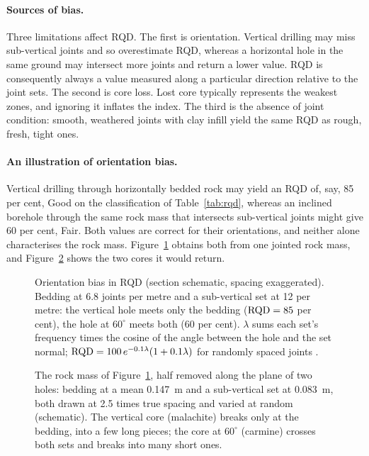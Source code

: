 \paragraph{Sources of bias.}
Three limitations affect RQD. The first is orientation. Vertical
drilling may miss sub-vertical joints and so overestimate RQD, whereas a
horizontal hole in the same ground may intersect more joints and return a
lower value. RQD is consequently always a value
measured along a particular direction relative to the joint sets. The second is core
loss. Lost core typically represents the weakest zones, and ignoring it
inflates the index. The third is the absence of joint condition: smooth,
weathered joints with clay infill yield the same RQD as rough, fresh, tight
ones.

\paragraph{An illustration of orientation bias.}
Vertical drilling through horizontally bedded rock may yield an RQD of, say,
85 per cent, Good on the classification of Table~\ref{tab:rqd}, whereas an
inclined borehole through the same rock mass that intersects sub-vertical
joints might give 60 per cent, Fair. Both values are correct for their
orientations, and neither alone characterises the rock mass.
Figure~\ref{fig:rqd-orientation-bias} obtains both from one jointed rock mass,
and Figure~\ref{fig:r3d-rqd-orientation} shows the two cores it would return.

\begin{figure}[htbp]
\centering
{}
\caption{Orientation bias in RQD (section schematic, spacing exaggerated). Bedding at 6.8 joints per metre and a sub-vertical set at 12 per metre: the vertical hole meets only the bedding ($\mathrm{RQD} = 85$ per cent), the hole at $60^\circ$ meets both (60 per cent). $\lambda$ sums each set's frequency times the cosine of the angle between the hole and the set normal; $\mathrm{RQD} = 100\,e^{-0.1\lambda}(1+0.1\lambda)$ for randomly spaced joints \citep{priest1976discontinuity}.}
\label{fig:rqd-orientation-bias}
\end{figure}

\begin{figure}[htbp]
\centering
{}
\caption{The rock mass of Figure~\ref{fig:rqd-orientation-bias}, half removed
along the plane of two holes: bedding at a mean 0.147~m and a sub-vertical set
at 0.083~m, both drawn at 2.5 times true spacing and varied at random
(schematic). The vertical core (malachite) breaks only at the bedding, into a few
long pieces; the core at $60^\circ$ (carmine) crosses both sets and breaks into
many short ones.}
\label{fig:r3d-rqd-orientation}
\end{figure}

